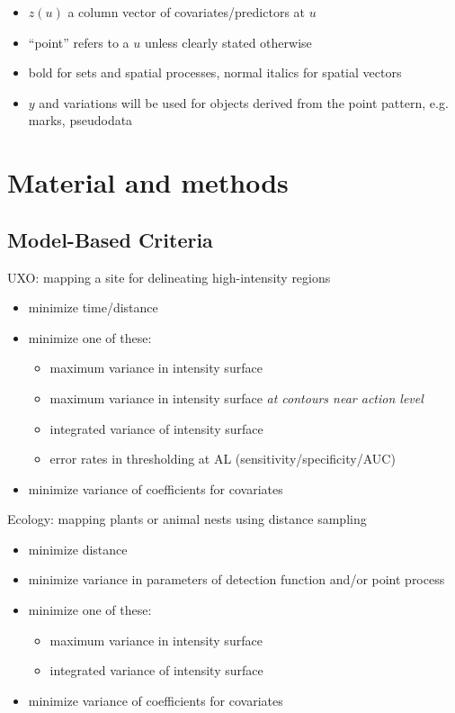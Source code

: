 \documentclass[review]{elsarticle}
\begin{document}
\begin{itemize}
\item \(z(u)\) a column vector of covariates/predictors at \(u\)

\item ``point'' refers to a \(u\) unless clearly stated otherwise

\item bold for sets and spatial processes, normal italics for spatial vectors

\item \(y\) and variations will be used for objects derived from the point
pattern, e.g. marks, pseudodata

\end{itemize}


\section{Material and methods}

\subsection{Model-Based Criteria}

UXO: mapping a site for delineating high-intensity regions
\begin{itemize}
\item minimize time/distance
\item minimize one of these:
\begin{itemize}
\item maximum variance in intensity surface
\item maximum variance in intensity surface \emph{at contours near action level}
\item integrated variance of intensity surface
\item error rates in thresholding at AL (sensitivity/specificity/AUC)
\end{itemize}
\item minimize variance of coefficients for covariates
\end{itemize}

Ecology: mapping plants or animal nests using distance sampling
\begin{itemize}
\item minimize distance
\item minimize variance in parameters of detection function and/or point process
\item minimize one of these:
\begin{itemize}
\item maximum variance in intensity surface
\item integrated variance of intensity surface
\end{itemize}
\item minimize variance of coefficients for covariates
\end{itemize}
\end{document}
